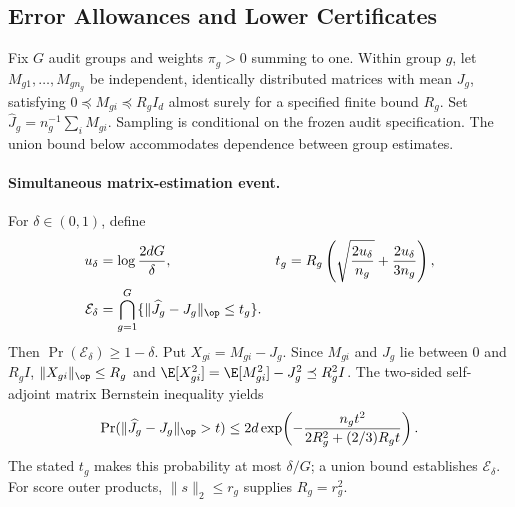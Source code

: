 \subsection{Error Allowances and Lower Certificates}
\label{app:lower-audit}

Fix $G$ audit groups and weights $\pi_g>0$ summing to one. Within group $g$, let $M_{g1},\ldots,M_{gn_g}$ be independent, identically distributed matrices with mean $J_g$, satisfying $0\preceq M_{gi}\preceq R_gI_d$ almost surely for a specified finite bound $R_g$. Set $\widehat J_g=n_g^{-1}\sum_iM_{gi}$. Sampling is conditional on the frozen audit specification. The union bound below accommodates dependence between group estimates.

\paragraph{Simultaneous matrix-estimation event.}
For $\delta\in(0,1)$, define
\begin{equation}
\begin{aligned}
u_\delta&=\log\frac{2dG}{\delta},
&t_g&=R_g\left(\sqrt{\frac{2u_\delta}{n_g}}+\frac{2u_\delta}{3n_g}\right),\\
\mathcal E_\delta&=\bigcap_{g=1}^G
\{\lVert\widehat J_g-J_g\rVert_{\op}\le t_g\}.
\end{aligned}
\label{eq:appB-matrix-event}
\end{equation}
Then $\Pr(\mathcal E_\delta)\ge1-\delta$. Put $X_{gi}=M_{gi}-J_g$. Since $M_{gi}$ and $J_g$ lie between $0$ and $R_gI$, $\lVert X_{gi}\rVert_{\op}\le R_g$ and $\E[X_{gi}^2]=\E[M_{gi}^2]-J_g^2\preceq R_g^2I$. The two-sided self-adjoint matrix Bernstein inequality \citep{tropp2012user} yields
\begin{equation}
\Pr(\lVert\widehat J_g-J_g\rVert_{\op}>t)
\le2d\exp\!\left(-\frac{n_gt^2}{2R_g^2+(2/3)R_gt}\right).
\label{eq:appB-bernstein}
\end{equation}
The stated $t_g$ makes this probability at most $\delta/G$; a union bound establishes $\mathcal E_\delta$. For score outer products, $\lVert s\rVert_2\le r_g$ supplies $R_g=r_g^2$.


